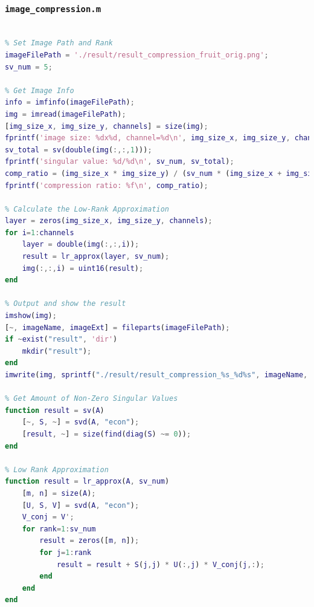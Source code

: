 \documentclass[12pt]{article}
\theoremstyle{definition}
\begin{document}
\subsubsection*{\texttt{image\_compression.m}}
\begin{lstlisting}[language=Matlab, style=mystyle]
% image_compression.m

% Set Image Path and Rank
imageFilePath = './result/result_compression_fruit_orig.png';
sv_num = 5;

% Get Image Info
info = imfinfo(imageFilePath);
img = imread(imageFilePath);
[img_size_x, img_size_y, channels] = size(img);
fprintf('image size: %dx%d, channel=%d\n', img_size_x, img_size_y, channels);
sv_total = sv(double(img(:,:,1)));
fprintf('singular value: %d/%d\n', sv_num, sv_total);
comp_ratio = (img_size_x * img_size_y) / (sv_num * (img_size_x + img_size_y + 1));
fprintf('compression ratio: %f\n', comp_ratio);

% Calculate the Low-Rank Approximation
layer = zeros(img_size_x, img_size_y, channels);
for i=1:channels
    layer = double(img(:,:,i));
    result = lr_approx(layer, sv_num);
    img(:,:,i) = uint16(result);
end

% Output and show the result
imshow(img);
[~, imageName, imageExt] = fileparts(imageFilePath);
if ~exist("result", 'dir')
    mkdir("result");
end
imwrite(img, sprintf("./result/result_compression_%s_%d%s", imageName, sv_num, imageExt), "png");

% Get Amount of Non-Zero Singular Values
function result = sv(A)
    [~, S, ~] = svd(A, "econ");
    [result, ~] = size(find(diag(S) ~= 0));
end

% Low Rank Approximation
function result = lr_approx(A, sv_num)
    [m, n] = size(A);
    [U, S, V] = svd(A, "econ");
    V_conj = V';
    for rank=1:sv_num
        result = zeros([m, n]);
        for j=1:rank
            result = result + S(j,j) * U(:,j) * V_conj(j,:);
        end
    end
end
\end{lstlisting}
\end{document}
